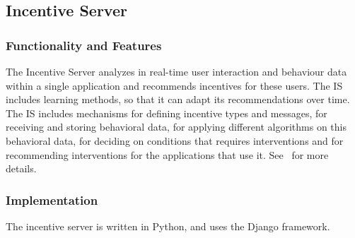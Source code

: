 \subsection{Incentive Server}
\subsubsection{Functionality and Features}
The Incentive Server analyzes in real-time user interaction and behaviour data within a single application and recommends incentives for these  users. The IS includes learning methods, so that it can adapt its recommendations over time. The IS includes mechanisms for defining  incentive types and messages, for receiving and storing behavioral data, for applying different  algorithms on this behavioral data, for deciding on conditions that requires interventions and for  recommending interventions for the applications that use it. See~\cite{D5.4} for more details.
\subsubsection{Implementation}
The incentive server is written in Python, and uses the Django framework. 
